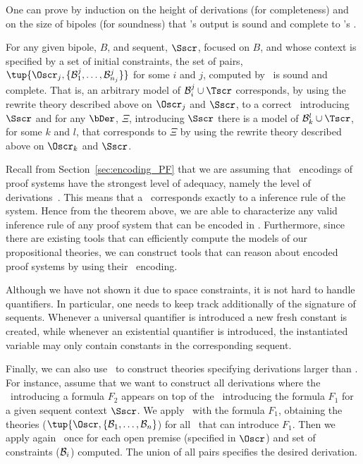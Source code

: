 One can prove by induction on the height of derivations (for completeness)
and on the size of bipoles (for soundness) that \bipole's output is
sound and complete to \sellf's \bDers.

\begin{theorem}
 For any given bipole, $B$, and sequent, $\Sscr$, focused on $B$, and
whose context is specified by a set of initial constraints, the set
of pairs, $\tup{\Oscr_j, \{\groundSet_1^j, \ldots, \groundSet_{n_j}^j\}}$
for some $i$ and $j$,
computed by \bipole\ is sound and complete. That is, 
an arbitrary model of $\groundSet_i^j \cup \thSeq$ corresponds, by using
the rewrite theory described above on $\Oscr_j$ and $\Sscr$, to a correct
\bDer\ introducing $\Sscr$
and for any $\bDer$, $\Xi$, introducing $\Sscr$ there is a
model of $\groundSet_k^l \cup \thSeq$, for some $k$ and $l$, that
corresponds to $\Xi$  by using the rewrite theory described above on
$\Oscr_k$ and $\Sscr$.
\end{theorem}

Recall from Section~\ref{sec:encoding_PF} that we are assuming that
\sellf\ encodings of proof systems have the strongest level of adequacy,
namely the level of derivations~\cite{nigam10jar}. This means that a
\bDer\ corresponds exactly to a inference rule of the system. Hence from
the theorem above, we are able to characterize any valid inference rule of
any proof system that can be encoded in \sellf. Furthermore, since there 
are existing tools that can efficiently compute the models of our
propositional theories, we can construct tools that can reason about
encoded proof systems by using their \sellf\ encoding.

Although we have not shown it due to space constraints, it is not hard to
handle quantifiers. In particular, one needs to keep track additionally of
the signature of sequents. Whenever a universal quantifier is introduced a
new fresh constant is created, while whenever an existential quantifier is
introduced, the instantiated variable may only contain constants in the
corresponding sequent. 

Finally, we can also use \bipole\ to construct theories specifying
derivations larger than \bDers. For instance, assume that we want to
construct all derivations where the \bDer\ introducing a formula $F_2$
appears on top of the \bDer\ introducing the formula $F_1$ for a
given sequent context $\Sscr$. We apply \bipole\ with the formula
$F_1$, obtaining the theories ($\tup{\Oscr, \{\groundSet_1, \ldots,
\groundSet_n}$) for all \bDers\
that can introduce $F_1$. Then we apply again
\bipole\ once for each open premise (specified in $\Oscr$) and set of
constraints ($\mathcal{B}_i$) computed. The union of all pairs specifies the
desired derivation.

\newcommand{\ctx}[4]{{\ensuremath{\tsl{ctx}(\ensuremath{#1},
\ensuremath{#2},\ensuremath{#3},\ensuremath{#4})}}}
\newcommand{\inLeaf}[2]{{\ensuremath{\tsl{inLf}(\ensuremath{#1},\ensuremath
{#2})
}}}
\newcommand{\notProvIf}[2]{\ensuremath{{\tsl{nPrIf}(\ensuremath{#1},
\ensuremath {#2})}}}
\newcommand{\provIf}[2]{\ensuremath{{\tsl{prIf}(\ensuremath{#1},
\ensuremath{#2})}}}

\newcommand\derOne{\tsl{dr1}}
\newcommand\derTwo{\tsl{dr2}}
\newcommand\Prov{\Pscr}

